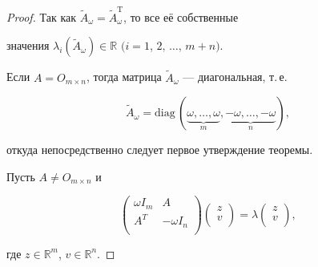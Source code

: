 \begin{proof}

Так как $\tilde A_\omega=\tilde A_{\omega}^\mathrm{T}$, то все её собственные

значения $\lambda_i(\tilde A_\omega)\in\mathbb{R}$ $(i=1$, $2,\,\dots,\,m+n)$.



Если $A=O_{m \times n}$, тогда матрица $\tilde A_\omega$ --- диагональная, т.\,е.

$$ \tilde A_\omega=\mathrm{diag}\,(\underbrace{\omega,\dots,\omega}_m,

\underbrace{-\omega,\dots,-\omega}_n),

$$

откуда непосредственно следует первое утверждение теоремы.



Пусть $A\neq O_{m\times n}$ и

$$ \left(

     \begin{array}{cc}

       \omega I_m & A \\

       A^T & -\omega I_n \\

     \end{array}

   \right)\left(

            \begin{array}{c}

              z \\

              v \\

            \end{array}

          \right)=\lambda\left(

                           \begin{array}{c}

                             z \\

                             v \\

                           \end{array}

                         \right),

$$

где $z\in\mathbb{R}^m$, $v\in\mathbb{R}^n$.


\end{proof}
